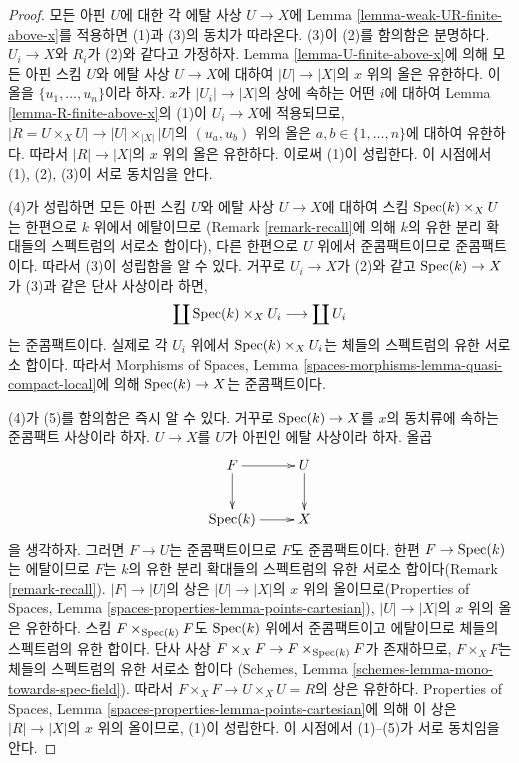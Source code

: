 \begin{proof}
모든 아핀 $U$에 대한 각 에탈 사상 $U \to X$에 Lemma
\ref{lemma-weak-UR-finite-above-x}를 적용하면 (1)과 (3)의 동치가
따라온다. (3)이 (2)를 함의함은 분명하다.
$U_i \to X$와 $R_i$가 (2)와 같다고 가정하자. Lemma
\ref{lemma-U-finite-above-x}에 의해 모든 아핀 스킴 $U$와 에탈 사상
$U \to X$에 대하여 $|U| \to |X|$의 $x$ 위의 올은 유한하다.
이 올을 $\{u_1, \ldots, u_n\}$이라 하자. $x$가
$|U_i| \to |X|$의 상에 속하는 어떤 $i$에 대하여
Lemma \ref{lemma-R-finite-above-x}의 (1)이 $U_i \to X$에 적용되므로,
$|R = U \times_X U| \to |U| \times_{|X|} |U|$의
$(u_a, u_b)$ 위의 올은 $a, b \in \{1, \ldots, n\}$에 대하여 유한하다.
따라서 $|R| \to |X|$의 $x$ 위의 올은 유한하다.
이로써 (1)이 성립한다. 이 시점에서 (1), (2), (3)이 서로 동치임을 안다.

\medskip\noindent
(4)가 성립하면 모든 아핀 스킴 $U$와 에탈 사상 $U \to X$에 대하여
스킴 $\mathop{\mathrm{Spec}}(k) \times_X U$는 한편으로 $k$ 위에서 에탈이므로
(Remark \ref{remark-recall}에 의해 $k$의 유한 분리 확대들의 스펙트럼의
서로소 합이다), 다른 한편으로 $U$ 위에서 준콤팩트이므로 준콤팩트이다.
따라서 (3)이 성립함을 알 수 있다.
거꾸로 $U_i \to X$가 (2)와 같고 $\mathop{\mathrm{Spec}}(k) \to X$가 (3)과 같은
단사 사상이라 하면,
$$
\coprod \mathop{\mathrm{Spec}}(k) \times_X U_i
\longrightarrow
\coprod U_i
$$
는 준콤팩트이다. 실제로 각 $U_i$ 위에서
$\mathop{\mathrm{Spec}}(k) \times_X U_i$는 체들의 스펙트럼의 유한 서로소 합이다.
따라서 Morphisms of Spaces, Lemma
\ref{spaces-morphisms-lemma-quasi-compact-local}에 의해
$\mathop{\mathrm{Spec}}(k) \to X$는 준콤팩트이다.

\medskip\noindent
(4)가 (5)를 함의함은 즉시 알 수 있다. 거꾸로 $\mathop{\mathrm{Spec}}(k) \to X$를
$x$의 동치류에 속하는 준콤팩트 사상이라 하자. $U \to X$를 $U$가
아핀인 에탈 사상이라 하자. 올곱
$$
\xymatrix{
F \ar[r] \ar[d] & U \ar[d] \\
\Spec(k) \ar[r] & X
}
$$
을 생각하자. 그러면 $F \to U$는 준콤팩트이므로 $F$도 준콤팩트이다.
한편 $F \to \mathop{\mathrm{Spec}}(k)$는 에탈이므로 $F$는 $k$의 유한 분리 확대들의
스펙트럼의 유한 서로소 합이다(Remark \ref{remark-recall}).
$|F| \to |U|$의 상은 $|U| \to |X|$의 $x$ 위의 올이므로(Properties of
Spaces, Lemma \ref{spaces-properties-lemma-points-cartesian}),
$|U| \to |X|$의 $x$ 위의 올은 유한하다.
스킴 $F \times_{\mathop{\mathrm{Spec}}(k)} F$도 $\mathop{\mathrm{Spec}}(k)$ 위에서 준콤팩트이고
에탈이므로 체들의 스펙트럼의 유한 합이다.
단사 사상 $F \times_X F \to F \times_{\mathop{\mathrm{Spec}}(k)} F$가 존재하므로,
$F \times_X F$는 체들의 스펙트럼의 유한 서로소 합이다
(Schemes, Lemma \ref{schemes-lemma-mono-towards-spec-field}).
따라서 $F \times_X F \to U \times_X U = R$의 상은 유한하다.
Properties of Spaces, Lemma
\ref{spaces-properties-lemma-points-cartesian}에 의해 이 상은
$|R| \to |X|$의 $x$ 위의 올이므로, (1)이 성립한다.
이 시점에서 (1)--(5)가 서로 동치임을 안다.


\end{proof}

